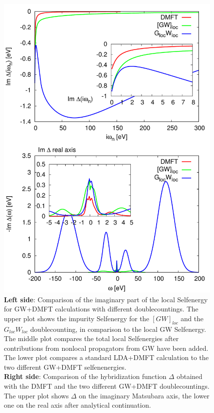 \documentclass[12pt,a4paper]{scrartcl}
\numberwithin{equation}{section}
\begin{document}
\begin{figure}[H]
\begin{minipage}{0.5\textwidth}
\end{minipage}
\begin{minipage}{0.5\textwidth}
\includegraphics[width=1\textwidth]{figs/results/SrVO3_hybrid_dc_comp.pdf}  
\end{minipage}
\caption{\textbf{Left side}: Comparison of the imaginary part of the local Selfenergy
for GW+DMFT calculations with different doublecountings. The upper plot shows the impurity Selfenergy
for the $[GW]_{loc}$ and the $G_{loc}W_{loc}$ doublecounting, in comparison to the
local GW Selfenergy.\\
The middle plot compares the total local Selfenergies after contributions from
nonlocal propagators from GW have been added.\\
The lower plot compares a standard LDA+DMFT calculation to the two different GW+DMFT 
selfenenergies.\\
\textbf{Right side}:
Comparison of the hybridization function $\Delta$ obtained with the DMFT and the two different GW+DMFT
doublecountings. The upper plot shows $\Delta$ on the imaginary Matsubara axis, the lower
one on the real axis after analytical continuation.}
\label{fig:results_sigma_hybrid_svo}
\end{figure}
\end{document}
